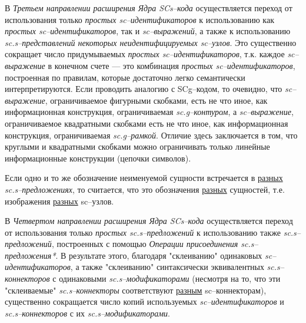 В \textit{Третьем направлении расширения Ядра SCs--кода} осуществляется переход от использования только \textit{простых sc--идентификаторов} к использованию как \textit{простых sc--идентификаторов}, так и \textit{sc--выражений}, а также к использованию \textit{sc.s--представлений некоторых неидентифицируемых sc--узлов}. Это существенно сокращает число придумываемых \textit{простых sc--идентификаторов}, т.к. каждое \textit{sc--выражение} в конечном счете — это комбинация \textit{простых sc--идентификаторов}, построенная по правилам, которые достаточно легко семантически интерпретируются. Если проводить аналогию с SCg--кодом, то очевидно, что \textit{\mbox{sc--выражение}}, ограничиваемое фигурными скобками, есть не что иное, как информационная конструкция, ограничиваемая \textit{sc.g--контуром}, а \textit{sc--выражение}, ограничиваемое квадратными скобками есть не что иное, как информационная конструкция, ограничиваемая \textit{sc.g--рамкой}. Отличие здесь заключается в том, что круглыми и квадратными скобками можно ограничивать только линейные информационные конструкции (цепочки символов).

\begin{SCn}
\end{SCn}

Если одно и то же обозначение неименуемой сущности встречается в \uline{разных} \textit{sc.s--предложениях}, то считается, что это обозначения \uline{разных} сущностей, т.е. изображения \uline{разных} sc--узлов.


В \textit{Четвертом направлении расширения Ядра SCs--кода} осуществляется переход от использования только \textit{простых sc.s--предложений} к использованию также \textit{sc.s--предложений}, построенных с помощью \textit{\mbox{Операции} присоединения sc.s--предложения*}. В результате этого, благодаря "склеиванию"{} одинаковых \textit{\mbox{sc--идентификаторов}}, а также "склеиванию"{} синтаксически эквивалентных \textit{\mbox{sc.s--коннекторов}} с одинаковыми \textit{\mbox{sc.s--модификаторами}} (несмотря на то, что эти "склеиваемые"{} \textit{sc.s--коннекторы} соответствуют \uline{разным} \mbox{sc--коннекторам}), существенно сокращается число копий используемых \textit{\mbox{sc--идентификаторов}} и \textit{\mbox{sc.s--коннекторов}} с их \textit{\mbox{sc.s--модификаторами}}.

